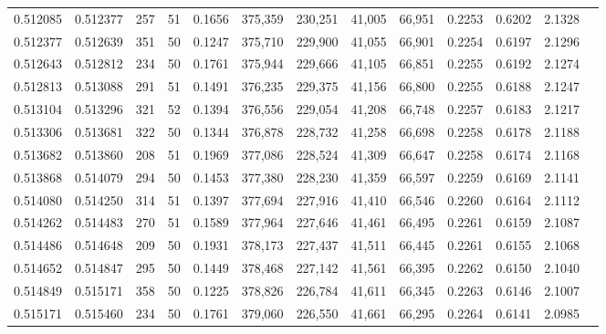 \begin{tabular}{rrrrrrrrrrrrr}
0.512085 & 0.512377 &   257 &  51 &                                     0.1656 & 375,359 & 230,251 &  41,005 &  66,951 & 0.2253 & 0.6202 & 2.1328 \\
0.512377 & 0.512639 &   351 &  50 &                                     0.1247 & 375,710 & 229,900 &  41,055 &  66,901 & 0.2254 & 0.6197 & 2.1296 \\
0.512643 & 0.512812 &   234 &  50 &                                     0.1761 & 375,944 & 229,666 &  41,105 &  66,851 & 0.2255 & 0.6192 & 2.1274 \\
0.512813 & 0.513088 &   291 &  51 &                                     0.1491 & 376,235 & 229,375 &  41,156 &  66,800 & 0.2255 & 0.6188 & 2.1247 \\
0.513104 & 0.513296 &   321 &  52 &                                     0.1394 & 376,556 & 229,054 &  41,208 &  66,748 & 0.2257 & 0.6183 & 2.1217 \\
0.513306 & 0.513681 &   322 &  50 &                                     0.1344 & 376,878 & 228,732 &  41,258 &  66,698 & 0.2258 & 0.6178 & 2.1188 \\
0.513682 & 0.513860 &   208 &  51 &                                     0.1969 & 377,086 & 228,524 &  41,309 &  66,647 & 0.2258 & 0.6174 & 2.1168 \\
0.513868 & 0.514079 &   294 &  50 &                                     0.1453 & 377,380 & 228,230 &  41,359 &  66,597 & 0.2259 & 0.6169 & 2.1141 \\
0.514080 & 0.514250 &   314 &  51 &                                     0.1397 & 377,694 & 227,916 &  41,410 &  66,546 & 0.2260 & 0.6164 & 2.1112 \\
0.514262 & 0.514483 &   270 &  51 &                                     0.1589 & 377,964 & 227,646 &  41,461 &  66,495 & 0.2261 & 0.6159 & 2.1087 \\
0.514486 & 0.514648 &   209 &  50 &                                     0.1931 & 378,173 & 227,437 &  41,511 &  66,445 & 0.2261 & 0.6155 & 2.1068 \\
0.514652 & 0.514847 &   295 &  50 &                                     0.1449 & 378,468 & 227,142 &  41,561 &  66,395 & 0.2262 & 0.6150 & 2.1040 \\
0.514849 & 0.515171 &   358 &  50 &                                     0.1225 & 378,826 & 226,784 &  41,611 &  66,345 & 0.2263 & 0.6146 & 2.1007 \\
0.515171 & 0.515460 &   234 &  50 &                                     0.1761 & 379,060 & 226,550 &  41,661 &  66,295 & 0.2264 & 0.6141 & 2.0985 \\

\end{tabular}
